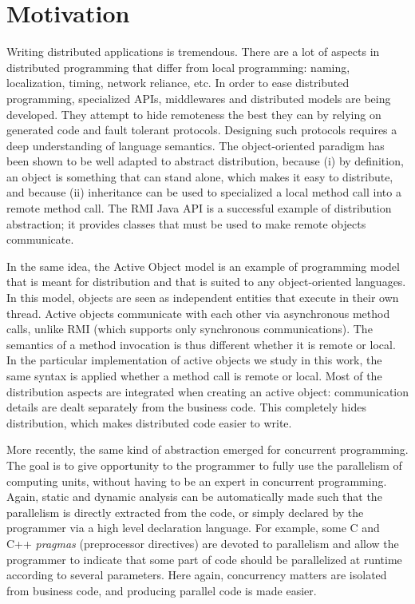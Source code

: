 \documentclass[11pt]{report}
\begin{document}
\section{Motivation}
Writing distributed applications is tremendous. There are a lot of aspects in distributed programming that differ from local programming: naming, localization, timing, network reliance, etc. In order to ease distributed programming, specialized APIs, middlewares and distributed models are being developed. They attempt to hide remoteness the best they can by relying on generated code and fault tolerant protocols. Designing such protocols requires a deep understanding of language semantics. The object-oriented paradigm has been shown to be well adapted to abstract distribution, because (i) by definition, an object is something that can stand alone, which makes it easy to distribute, and because (ii) inheritance can be used to specialized a local method call into a remote method call. The RMI Java API \cite{ref:rmi} is a successful example of distribution abstraction; it provides classes that must be used to make remote objects communicate. 

In the same idea, the Active Object model \cite{ref:Lavender95activeobject} is an example of programming model that is meant for distribution and that is suited to any object-oriented languages. In this model, objects are seen as independent entities that execute in their own thread. Active objects communicate with each other via asynchronous method calls, unlike RMI (which supports only synchronous communications). The semantics of a method invocation is thus different whether it is remote or local.
In the particular implementation of active objects we study in this work, the same syntax is applied whether a method call is remote or local. Most of the distribution aspects are integrated when creating an active object: communication details are dealt separately from the business code. This completely hides distribution, which makes distributed code easier to write. 

More recently, the same kind of abstraction emerged for concurrent programming. The goal is to give opportunity to the programmer to fully use the parallelism of computing units, without having to be an expert in concurrent programming. Again, static and dynamic analysis can be automatically made such that the parallelism is directly extracted from the code, or simply declared by the programmer via a high level declaration language. For example, some C and C++ \emph{pragmas} (preprocessor directives) \cite{ref:openmp} are devoted to parallelism and allow the programmer to indicate that some part of code should be parallelized at runtime according to several parameters. Here again, concurrency matters are isolated from business code, and producing parallel code is made easier.
\end{document}

